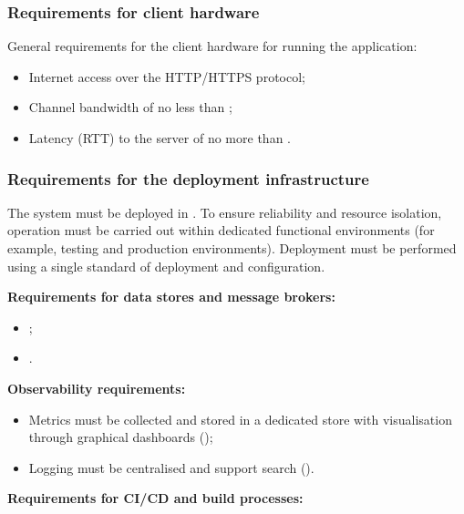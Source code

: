 \documentclass[12pt,a4paper]{extarticle}
\begin{document}
\subsubsection{Requirements for client hardware}

General requirements for the client hardware for running the application:

\begin{itemize}[leftmargin=1.25cm]
\item Internet access over the HTTP/HTTPS protocol;
\item Channel bandwidth of no less than ;
\item Latency (RTT) to the server of no more than .
\end{itemize}

\subsubsection{Requirements for the deployment infrastructure}
\label{sec:deployment_infra}

The system must be deployed in . To ensure reliability and resource isolation, operation must be carried out within dedicated functional environments (for example, testing and production environments). Deployment must be performed using a single standard of deployment and configuration.

\textbf{Requirements for data stores and message brokers:}

\begin{itemize}[leftmargin=1.25cm]
\item {};
\item {}.
\end{itemize}

\textbf{Observability requirements:}

\begin{itemize}[leftmargin=1.25cm]
\item Metrics must be collected and stored in a dedicated store with visualisation through graphical dashboards ();
\item Logging must be centralised and support search ().
\end{itemize}

\textbf{Requirements for CI/CD and build processes:}
\end{document}
